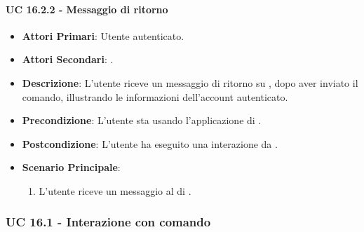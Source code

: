 		\paragraph{UC 16.2.2 - Messaggio di ritorno}
		\begin{itemize}
			\item \textbf{Attori Primari}: Utente autenticato.
			\item \textbf{Attori Secondari}: .
			\item \textbf{Descrizione}: L'utente riceve un messaggio di ritorno su , dopo aver inviato il comando, illustrando le informazioni dell'account autenticato.
			\item \textbf{Precondizione}: L'utente sta usando l'applicazione di .
			\item \textbf{Postcondizione}: L'utente ha eseguito una interazione da .
			\item \textbf{Scenario Principale}:
			\begin{enumerate}
				\item L'utente riceve un messaggio al  di .
			\end{enumerate}
		\end{itemize}


	\subsubsection{UC 16.1 - Interazione con comando}

